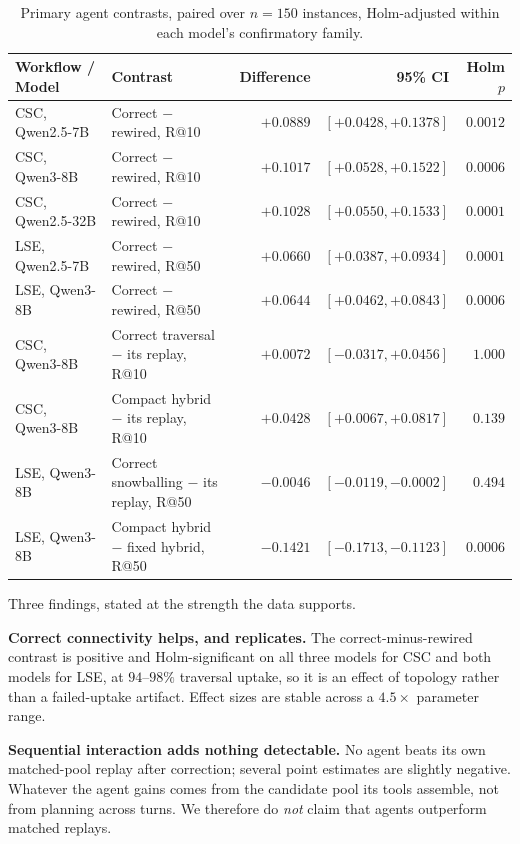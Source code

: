 \begin{table}[t]
\centering
\small
\caption{Primary agent contrasts, paired over $n{=}150$ instances, Holm-adjusted within each
model's confirmatory family.}
\label{tab:ar-agent-comp}
\begin{tabular}{llrrr}
\toprule
Workflow / Model & Contrast & Difference & 95\% CI & Holm $p$ \\
\midrule
CSC, Qwen2.5-7B & Correct $-$ rewired, R@10 & $+0.0889$ & $[+0.0428, +0.1378]$ & $0.0012$ \\
CSC, Qwen3-8B & Correct $-$ rewired, R@10 & $+0.1017$ & $[+0.0528, +0.1522]$ & $0.0006$ \\
CSC, Qwen2.5-32B & Correct $-$ rewired, R@10 & $+0.1028$ & $[+0.0550, +0.1533]$ & $0.0001$ \\
\addlinespace
LSE, Qwen2.5-7B & Correct $-$ rewired, R@50 & $+0.0660$ & $[+0.0387, +0.0934]$ & $0.0001$ \\
LSE, Qwen3-8B & Correct $-$ rewired, R@50 & $+0.0644$ & $[+0.0462, +0.0843]$ & $0.0006$ \\
\addlinespace
CSC, Qwen3-8B & Correct traversal $-$ its replay, R@10 & $+0.0072$ & $[-0.0317, +0.0456]$ & $1.000$ \\
CSC, Qwen3-8B & Compact hybrid $-$ its replay, R@10 & $+0.0428$ & $[+0.0067, +0.0817]$ & $0.139$ \\
LSE, Qwen3-8B & Correct snowballing $-$ its replay, R@50 & $-0.0046$ & $[-0.0119, -0.0002]$ & $0.494$ \\
LSE, Qwen3-8B & Compact hybrid $-$ fixed hybrid, R@50 & $-0.1421$ & $[-0.1713, -0.1123]$ & $0.0006$ \\
\bottomrule
\end{tabular}
\end{table}

Three findings, stated at the strength the data supports.

\textbf{Correct connectivity helps, and replicates.} The correct-minus-rewired contrast is positive
and Holm-significant on all three models for CSC and both models for LSE, at $94$--$98\%$ traversal
uptake, so it is an effect of topology rather than a failed-uptake artifact. Effect sizes are stable
across a $4.5{\times}$ parameter range.

\textbf{Sequential interaction adds nothing detectable.} No agent beats its own matched-pool replay
after correction; several point estimates are slightly negative. Whatever the agent gains comes from
the candidate pool its tools assemble, not from planning across turns. We therefore do \emph{not}
claim that agents outperform matched replays.

